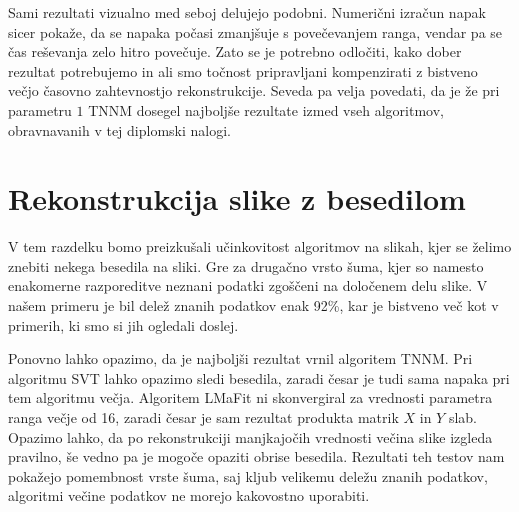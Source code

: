 Sami rezultati vizualno med seboj delujejo podobni. Numerični izračun napak sicer pokaže, da se napaka počasi zmanjšuje s povečevanjem ranga, vendar pa se čas reševanja zelo hitro povečuje. Zato se je potrebno odločiti, kako dober rezultat potrebujemo in ali smo točnost pripravljani kompenzirati z bistveno večjo časovno zahtevnostjo rekonstrukcije. Seveda pa velja povedati, da je že pri parametru $1$ TNNM dosegel najboljše rezultate izmed vseh algoritmov, obravnavanih v tej diplomski nalogi.

\section{Rekonstrukcija slike z besedilom} \label{1307-2254}
V tem razdelku bomo preizkušali učinkovitost algoritmov na slikah, kjer se želimo znebiti nekega besedila na sliki. Gre za drugačno vrsto šuma, kjer so namesto enakomerne razporeditve neznani podatki zgoščeni na določenem delu slike. V našem primeru je bil delež znanih podatkov enak 92\%, kar je bistveno več kot v primerih, ki smo si jih ogledali doslej.


Ponovno lahko opazimo, da je najboljši rezultat vrnil algoritem TNNM. Pri algoritmu SVT lahko opazimo sledi besedila, zaradi česar je tudi sama napaka pri tem algoritmu večja. Algoritem LMaFit ni skonvergiral za vrednosti parametra ranga večje od 16, zaradi česar je sam rezultat produkta matrik $X$ in $Y$ slab. Opazimo lahko, da po rekonstrukciji  manjkajočih vrednosti večina slike izgleda pravilno, še vedno pa je mogoče opaziti obrise besedila.
Rezultati teh testov nam pokažejo pomembnost vrste šuma, saj kljub velikemu deležu znanih podatkov, algoritmi večine podatkov ne morejo kakovostno uporabiti.

